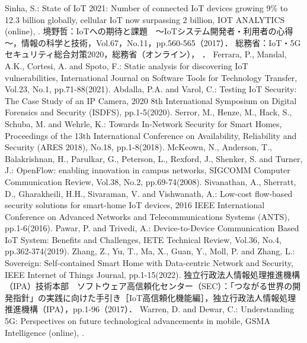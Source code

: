\documentclass[Japanese]{dicomopapers}
\begin{document}
\begin{thebibliography}{10}
	 Sinha, S.: State of IoT 2021: Number of connected IoT devices growing 9\% to 12.3 billion globally, cellular IoT now surpassing 2 billion, IOT ANALYTICS (online),
	.
	 境野哲：IoTへの期待と課題　～IoTシステム開発者・利用者の心得～，情報の科学と技術，Vol.67，No.11，pp.560-565（2017）．
	 総務省：IoT・5Gセキュリティ総合対策2020，総務省（オンライン），
	．
	 Ferrara, P., Mandal, A.K., Cortesi, A. and Spoto, F.: Static analysis for discovering IoT vulnerabilities, International Journal on Software Tools for Technology Transfer, Vol.23, No.1, pp.71-88(2021).
	 Abdalla, P.A. and Varol, C.: Testing IoT Security: The Case Study of an IP Camera, 2020 8th International Symposium on Digital Forensics and Security (ISDFS), pp.1-5(2020).
	 Serror, M., Henze, M., Hack, S., Schuba, M. and Wehrle, K.: Towards In-Network Security for Smart Homes, Proceedings of the 13th International Conference on Availability, Reliability and Security (ARES 2018), No.18, pp.1-8(2018).
	 McKeown, N., Anderson, T., Balakrishnan, H., Parulkar, G., Peterson, L., Rexford, J., Shenker, S. and Turner, J.: OpenFlow: enabling innovation in campus networks, SIGCOMM Computer Communication Review, Vol.38, No.2, pp.69-74(2008).
	 Sivanathan, A., Sherratt, D., Gharakheili, H.H., Sivaraman, V. and Vishwanath, A.: Low-cost flow-based security solutions for smart-home IoT devices, 2016 IEEE International Conference on Advanced Networks and Telecommunications Systems (ANTS), pp.1-6(2016).
	 Pawar, P. and Trivedi, A.: Device-to-Device Communication Based IoT System: Benefits and Challenges, IETE Technical Review, Vol.36, No.4, pp.362-374(2019).
	 Zhang, Z., Yu, T., Ma, X., Guan, Y., Moll, P. and Zhang, L.: Sovereign: Self-contained Smart Home with Data-centric Network and Security, IEEE Internet of Things Journal, pp.1-15(2022).
	 独立行政法人情報処理推進機構（IPA）技術本部　ソフトウェア高信頼化センター（SEC）：「つながる世界の開発指針」の実践に向けた手引き［IoT高信頼化機能編］，独立行政法人情報処理推進機構（IPA），pp.1-96（2017）．
	 Warren, D. and Dewar, C.: Understanding 5G: Perspectives on future technological advancements in mobile, GSMA Intelligence (online),
	.

\end{thebibliography}
\end{document}

